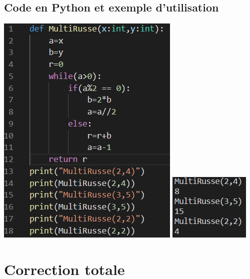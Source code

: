 \documentclass[12pt,a4paper]{report}
\begin{document}
\section{Code en Python et exemple d'utilisation}
\includegraphics[scale=0.5]{MultRussePython}
\includegraphics[scale=1]{ExemplesPython}



\chapter{Correction totale}
\end{document}
